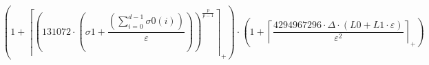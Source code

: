 \[\left(1 + \left\lceil \left(131072 \cdot \left(\sigma 1 + \frac{\left(\sum_{i=0}^{d-1} \sigma 0\left(i\right)\right)}{\varepsilon}\right)\right)^{\frac{p}{p - 1}} \right\rceil_{+}\right) \cdot \left(1 + \left\lceil \frac{4294967296 \cdot \Delta \cdot \left(L0 + L1 \cdot \varepsilon\right)}{\varepsilon^{2}} \right\rceil_{+}\right)\]
